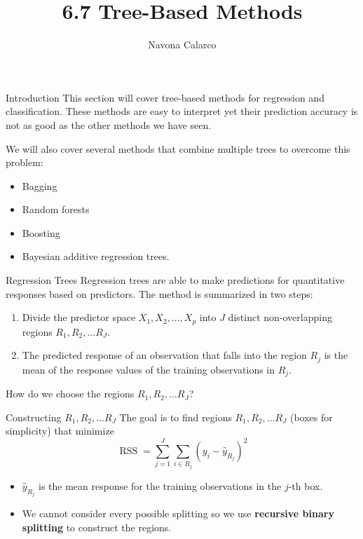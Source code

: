 \documentclass[
  ignorenonframetext,
  aspectratio=169,
]{beamer}
\title{6.7 Tree-Based Methods}
\author{Navona Calarco}
\date{}
\institute{The University of Toronto}
\begin{document}
\frame{\titlepage}
\ifdefined\Shaded\renewenvironment{Shaded}{\begin{tcolorbox}[enhanced, breakable, boxrule=0pt, sharp corners, interior hidden, borderline west={3pt}{0pt}{shadecolor}, frame hidden]}{\end{tcolorbox}}\fi

\begin{frame}{Introduction}
\protect\hypertarget{introduction}{}
This section will cover tree-based methods for regression and
classification. These methods are easy to interpret yet their prediction
accuracy is not as good as the other methods we have seen.

We will also cover several methods that combine multiple trees to
overcome this problem:

\begin{itemize}
\item
  Bagging
\item
  Random forests
\item
  Boosting
\item
  Bayesian additive regression trees.
\end{itemize}
\end{frame}

\begin{frame}{Regression Trees}
\protect\hypertarget{regression-trees}{}
Regression trees are able to make predictions for quantitative responses
based on predictors. The method is summarized in two steps:

\begin{enumerate}
\item
  Divide the predictor space \(X_1, X_2, \dots , X_p\) into \(J\)
  distinct non-overlapping regions \(R_1, R_2, \dots R_J\).
\item
  The predicted response of an observation that falls into the region
  \(R_j\) is the mean of the response values of the training
  observations in \(R_j\).
\end{enumerate}

How do we choose the regions \(R_1, R_2, \dots R_J\)?
\end{frame}

\begin{frame}{Constructing \(R_1, R_2, \dots R_J\)}
\protect\hypertarget{constructing-r_1-r_2-dots-r_j}{}
The goal is to find regions \(R_1, R_2, \dots R_J\) (boxes for
simplicity) that minimize
\[\operatorname{RSS} = \sum_{j=1}^{J} \sum_{i \in R_{j}}\left(y_{i}-\hat{y}_{R_{j}}\right)^{2}\]

\begin{itemize}
\item
  \(\hat{y}_{R_j}\) is the mean response for the training observations
  in the \(j\)-th box.
\item
  We cannot consider every possible splitting so we use
  \textbf{recursive binary splitting} to construct the regions.
\end{itemize}
\end{frame}
\end{document}
